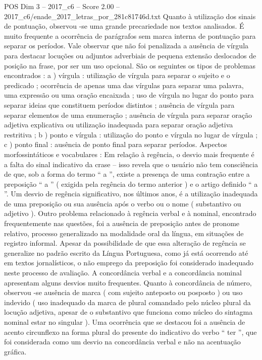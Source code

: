 \begin{textsample}{POS Dim 3 – 2017\_c6 – Score 2.00 – 2017\_c6/enade\_2017\_letras\_por\_281c81746d.txt}
Quanto à utilização dos sinais de pontuação, observou -se uma grande precariedade nos textos analisados.
É muito frequente a ocorrência de parágrafos sem marca interna de pontuação para separar os períodos.
Vale observar que não foi penalizada a ausência de vírgula para destacar locuções ou adjuntos adverbiais de pequena extensão deslocados de posição na frase, por ser um uso opcional.
São os seguintes os tipos de problemas encontrados : a ) vírgula : utilização de vírgula para separar o sujeito e o predicado ; ocorrência de apenas uma das vírgulas para separar uma palavra, uma expressão ou uma oração encaixada ; uso de vírgula no lugar do ponto para separar ideias que constituem períodos distintos ; ausência de vírgula para separar elementos de uma enumeração ; ausência de vírgula para separar oração adjetiva explicativa ou utilização inadequada para separar oração adjetiva restritiva ; b ) ponto e vírgula : utilização do ponto e vírgula no lugar de vírgula ; c ) ponto final : ausência de ponto final para separar períodos.
Aspectos morfossintáticos e vocabulares : Em relação à regência, o desvio mais frequente é a falta do sinal indicativo da crase – isso revela que o usuário não tem consciência de que, sob a forma do termo “ a ”, existe a presença de uma contração entre a preposição “ a ” ( exigida pela regência do termo anterior ) e o artigo definido “ a ”.
Um desvio de regência significativo, nos últimos anos, é a utilização inadequada de uma preposição ou sua ausência após o verbo ou o nome ( substantivo ou adjetivo ).
Outro problema relacionado à regência verbal e à nominal, encontrado frequentemente nas questões, foi a ausência de preposição antes de pronome relativo, processo generalizado na modalidade oral da língua, em situações de registro informal.
Apesar da possibilidade de que essa alteração de regência se generalize no padrão escrito da Língua Portuguesa, como já está ocorrendo até em textos jornalísticos, o não emprego da preposição foi considerado inadequado neste processo de avaliação.
A concordância verbal e a concordância nominal apresentam alguns desvios muito frequentes.
Quanto à concordância de número, observou -se ausência de marca ( com sujeito anteposto ou posposto ) ou uso indevido ( uso inadequado da marca de plural comandado pelo núcleo plural da locução adjetiva, apesar de o substantivo que funciona como núcleo do sintagma nominal estar no singular ).
Uma ocorrência que se destacou foi a ausência de acento circunflexo na forma plural do presente do indicativo do verbo “ ter ”, que foi considerada como um desvio na concordância verbal e não na acentuação gráfica.

\end{textsample}
